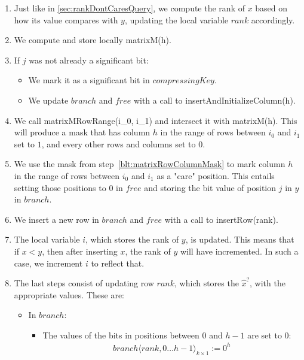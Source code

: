 \begin{enumerate}
\begin{enumerate}
        \item
        Just like in \ref{sec:rankDontCaresQuery}, we compute the rank of $x$ based on how its value compares with $y$, updating the local variable $rank$ accordingly.
        
        \item
        We compute and store locally {\ttfamily matrixM(h)}.
        
        \item
        If $j$ was not already a significant bit:
        \begin{itemize}
            \item
            We mark it as a significant bit in $compressingKey$.
            
            \item
            We update $branch$ and $free$ with a call to {\ttfamily insertAndInitializeColumn(h)}.
        \end{itemize}
        
        \item \label{blt:matrixRowColumnMask}
        We call {\ttfamily matrixMRowRange(i\_0, i\_1)} and intersect it with  {\ttfamily matrixM(h)}. This will produce a mask that has column $h$ in the range of rows between $i_0$ and $i_1$ set to $1$, and every other rows and columns set to $0$.
        
        \item
        We use the mask from step~\ref{blt:matrixRowColumnMask} to mark column $h$ in the range of rows between $i_0$ and $i_1$ as a "care" position. This entails setting those positions to $0$ in $free$ and storing the bit value of position $j$ in $y$ in $branch$.
        
        \item
        We insert a new row in $branch$ and $free$ with a call to {\ttfamily insertRow(rank)}.
        
        \item
        The local variable $i$, which stores the rank of $y$, is updated. This means that if $x < y$, then after inserting $x$, the rank of $y$ will have incremented. In such a case, we increment $i$ to reflect that.
        
        \item
        The last steps consist of updating row $rank$, which stores the $\hat x^?$, with the appropriate values. These are:
        \begin{itemize}
            \item
            In $branch$:
            \begin{itemize}
                \item
                The values of the bits in positions between $0$ and $h - 1$ are set to $0$:
                \begin{align*}
                    branch\langle rank, 0 \dots h - 1 \rangle_{k \times 1} := 0^h
                \end{align*}
                

\end{itemize}
\end{itemize}
\end{enumerate}
\end{enumerate}

